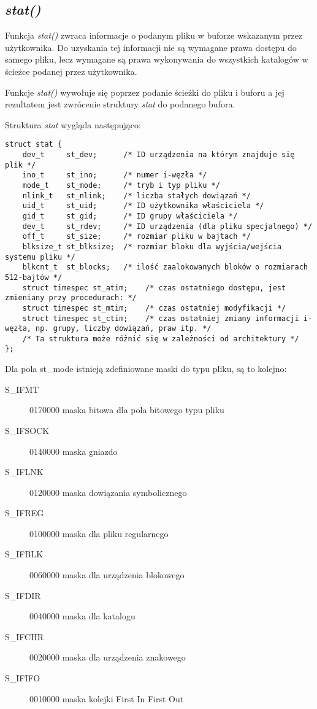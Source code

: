 \documentclass{article}
\begin{document}
\subsection{\textit{stat()}}

Funkcja\textit{ stat()} zwraca informacje o podanym pliku w buforze wskazanym przez użytkownika. 
Do uzyskania tej informacji nie są wymagane prawa dostępu do samego pliku, lecz wymagane są prawa wykonywania do wszystkich katalogów w ścieżce podanej przez użytkownika. 

Funkcje\textit{ stat()} wywołuje się poprzez podanie ścieżki do pliku i buforu a jej rezultatem jest zwrócenie struktury \textit{stat} do podanego bufora. 

Struktura \textit{stat} wygląda następująco:
\begin{verbatim}
struct stat {
    dev_t     st_dev;      /* ID urządzenia na którym znajduje się plik */
    ino_t     st_ino;      /* numer i-węzła */
    mode_t    st_mode;     /* tryb i typ pliku */
    nlink_t   st_nlink;    /* liczba stałych dowiązań */
    uid_t     st_uid;      /* ID użytkownika właściciela */
    gid_t     st_gid;      /* ID grupy właściciela */
    dev_t     st_rdev;     /* ID urządzenia (dla pliku specjalnego) */
    off_t     st_size;     /* rozmiar pliku w bajtach */
    blksize_t st_blksize;  /* rozmiar bloku dla wyjścia/wejścia systemu pliku */
    blkcnt_t  st_blocks;   /* ilość zaalokowanych bloków o rozmiarach 512-bajtów */
    struct timespec st_atim;    /* czas ostatniego dostępu, jest zmieniany przy procedurach: */
    struct timespec st_mtim;    /* czas ostatniej modyfikacji */
    struct timespec st_ctim;    /* czas ostatniej zmiany informacji i-węzła, np. grupy, liczby dowiązań, praw itp. */
    /* Ta struktura może różnić się w zależności od architektury */
};
\end{verbatim}
Dla pola st\_mode istnieją zdefiniowane maski do typu pliku, są to kolejno:
\begin{description}
\item[S\_IFMT]	0170000	maska bitowa dla pola bitowego typu pliku
\item[S\_IFSOCK]0140000	maska gniazdo
\item[S\_IFLNK]	0120000	maska dowiązania symbolicznego
\item[S\_IFREG]	0100000	maska dla pliku regularnego
\item[S\_IFBLK]	0060000	maska dla urządzenia blokowego
\item[S\_IFDIR]	0040000	maska dla katalogu
\item[S\_IFCHR]	0020000	maska dla urządzenia znakowego
\item[S\_IFIFO]	0010000	maska kolejki First In First Out
\end{description}
\end{document}
